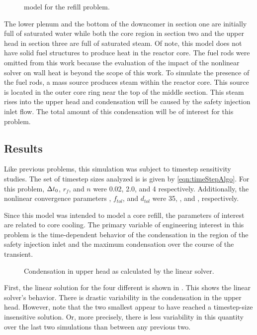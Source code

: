 \begin{figure}[h!tb]
\centering

\caption{\cobra{} model for the refill problem.}
\label{fig:refillModel}
\end{figure}

The lower plenum and the bottom of the downcomer in section one are initially full of saturated water while both the core region in section two and the upper head in section three are full of saturated steam.
Of note, this model does not have solid fuel structures to produce heat in the reactor core.
The fuel rods were omitted from this work because the evaluation of the impact of the nonlinear solver on wall heat is beyond the scope of this work.
To simulate the presence of the fuel rods, a mass source produces steam within the reactor core.
This source is located in the outer core ring near the top of the middle section.
This steam rises into the upper head and condensation will be caused by the safety injection inlet flow.
The total amount of this condensation will be of interest for this problem.

\subsection{Results}
\label{sect:refillResults}

Like previous problems, this simulation was subject to timestep sensitivity studies.
The set of timestep sizes analyzed is is given by \eqref{eqn:timeStepAlgo}.
For this problem, $\dt{}_{0}$, $r_{f}$, and ${n}$ were 0.02, 2.0, and 4 respectively.
Additionally, the nonlinear convergence parameters \kmax{}, $f_{tol}$, and $d_{tol}$ were 35, , and , respectively.

Since this model was intended to model a core refill, the parameters of interest are related to core cooling.
The primary variable of engineering interest in this problem is the time-dependent behavior of the condensation in the region of the safety injection inlet and the maximum condensation over the course of the transient.

\begin{figure}[h!tb]
\centering

\caption{Condensation in upper head as calculated by the linear solver.}
\label{fig:refillGammaLin}
\end{figure}

First, the linear solution for the four different \dtmax{} is shown in .
This shows the linear solver's behavior.
There is drastic variability in the condensation in the upper head.
However, note that the two smallest \dtmax{} appear to have reached a timestep-size insensitive solution.
Or, more precisely, there is less variability in this quantity over the last two simulations than between any previous two.

